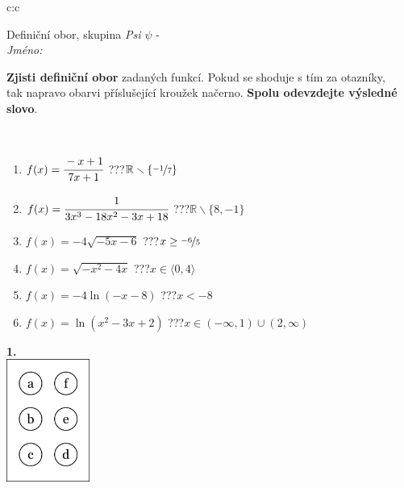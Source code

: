 \documentclass[10pt]{report}
\begin{document}
\begin{tabular}{c:c}
\begin{minipage}[c][104.5mm][t]{0.5\linewidth}
\begin{center}
\vspace{7mm}
{\huge Definiční obor, skupina \textit{Psi $\psi$} -}\\[5mm]
\textit{Jméno:}\phantom{xxxxxxxxxxxxxxxxxxxxxxxxxxxxxxxxxxxxxxxxxxxxxxxxxxxxxxxxxxxxxxxxx}\\[5mm]
\begin{minipage}{0.95\linewidth}
\begin{center}
\textbf{Zjisti definiční obor} zadaných funkcí. Pokud se shoduje s tím za otazníky,\\tak napravo obarvi příslušející kroužek načerno. \textbf{Spolu odevzdejte výsledné slovo}.
\end{center}
\end{minipage}
\\[1mm]
\begin{minipage}{0.79\linewidth}
\begin{center}
\begin{varwidth}{\linewidth}
\begin{enumerate}
\normalsizerrr
\item $f(x)=\cfrac{-x+1}{7x+1}$\quad \dotfill\; ???\;\dotfill \quad $\mathbb{R}\smallsetminus\{\nicefrac{-1}{7}\}$
\item $f(x)=\cfrac{1}{3x^3-18x^2-3x+18}$\quad \dotfill\; ???\;\dotfill \quad $\mathbb{R}\smallsetminus\{8,-1\}$
\item $f(x)=-4\sqrt{-5x-6}$\quad \dotfill\; ???\;\dotfill \quad $x\geq\nicefrac{-6}{5}$
\item $f(x)=\sqrt{-x^2-4x}$\quad \dotfill\; ???\;\dotfill \quad $x\in\langle0 , 4\rangle$
\item $f(x)=-4\ln{(-x-8)}$\quad \dotfill\; ???\;\dotfill \quad $x<-8$
\item $f(x)=\ln{(x^2-3x+2)}$\quad \dotfill\; ???\;\dotfill \quad $x\in(-\infty , 1)\cup(2 , \infty)$
\end{enumerate}
\end{varwidth}
\end{center}
\end{minipage}
\begin{minipage}{0.20\linewidth}
\begin{center}
{\Huge\bfseries 1.} \\[2mm]
\includegraphics[height=40mm]{../images/braille.png}

\end{center}
\end{minipage}
\end{center}
\end{minipage}
\end{tabular}
\end{document}

